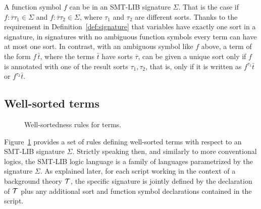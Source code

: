 A function symbol $f$ can be 
in an SMT-LIB signature $\Sigma$.
That is the case if $f:\overline{\tau}\tau_1 \in \Sigma$ and $f:\overline{\tau}\tau_2 \in \Sigma$, 
where $\tau_1$ and $\tau_2$ are different sorts.
Thanks to the requirement in Definition~\ref{def:signature} that
variables have exactly one sort in a signature,
in signatures with no ambiguous function symbols
every term can have at most one sort.
In contrast,
with an ambiguous symbol like $f$ above,
a term of the form $f\, \bar{t}$,
where the terms $\bar t$ have sorts $\overline \tau$, can be given 
a unique sort only if $f$ is annotated with one of the result sorts $\tau_1, \tau_2$,
that is, only if it is written as $f^{\tau_1}\bar{t}$ or $f^{\tau_2}\bar{t}$. 





\subsection{Well-sorted terms}
 
\begin{figure}
 \termrules
\caption{Well-sortedness rules for terms.}
\label{fig:well-sorted-terms}
\end{figure}

Figure~\ref{fig:well-sorted-terms} provides a set of rules defining 
well-sorted terms with respect to an SMT-LIB signature $\Sigma$.
Strictly speaking then, and similarly to more conventional logics,
the SMT-LIB logic language is a family of languages parametrized 
by the signature $\Sigma$.
As explained later, 
for each script working in the context of a background theory $\mathcal{T}$,
the specific signature is jointly defined by the declaration of $\mathcal{T}$ plus
any additional sort and function symbol declarations contained in the script.

